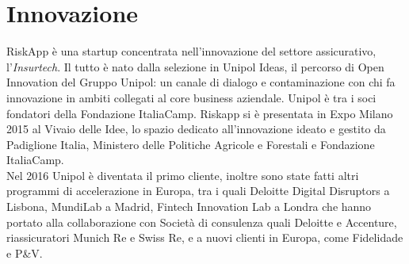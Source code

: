 \section{Innovazione}
RiskApp è una startup concentrata nell’innovazione del settore assicurativo, l’\textit{Insurtech}. Il tutto è nato dalla selezione in Unipol Ideas, il percorso di Open Innovation del Gruppo Unipol: un canale di dialogo e contaminazione con chi fa innovazione in ambiti collegati al core business aziendale. Unipol è tra i soci fondatori della Fondazione ItaliaCamp. Riskapp si è presentata in Expo Milano 2015 al Vivaio delle Idee, lo spazio dedicato all'innovazione ideato e gestito da Padiglione Italia, Ministero delle Politiche Agricole e Forestali e Fondazione ItaliaCamp\cite{site:riskapp-rai}. 
\medskip
\\Nel 2016 Unipol è diventata il primo cliente, inoltre sono state fatti altri programmi di accelerazione in Europa, tra i quali Deloitte Digital Disruptors\cite{site:deloitte-digital-startup} a Lisbona, MundiLab\cite{site:mundi-lab} a Madrid, Fintech Innovation Lab\cite{site:fintech} a Londra che hanno portato alla collaborazione con Società di consulenza quali Deloitte\cite{site:deloitte} e Accenture\cite{site:accenture}, riassicuratori Munich Re\cite{site:munich-re} e Swiss Re\cite{site:swiss-re}, e a nuovi clienti in Europa, come Fidelidade\cite{site:fidelidade} e P\&V\cite{site:pv}.


